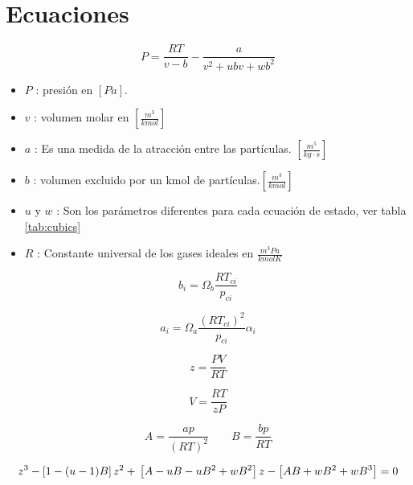 \chapter{Ecuaciones}



\begin{equation}\label{eq:pressure}
P = \frac{R T}{v-b} - \frac{a}{v^2 +u b v + w b^2 }
\end{equation}


\begin{itemize}\itemsep0ex
\item $P$ : presión en $[Pa]$.
\item $v$ : volumen molar en $[\frac{m^3}{kmol}]$
\item $a$ : Es una medida de la atracción entre las partículas. $[\frac{m^5}{kg \cdot s}]$
\item $b$ : volumen excluido por un kmol de partículas.$[\frac{m^3}{kmol}]$
\item $u$ y $w$ : Son los parámetros diferentes para cada ecuación de estado, ver tabla \ref{tab:cubics}
\item $R$ : Constante universal de los gases ideales en $\frac{m^3 Pa}{kmol K}$
\end{itemize}


\begin{equation}\label{eq:a}
	b_i = \Omega_b \frac{R T_{ci}}{p_{ci}} 
\end{equation}

\begin{equation}\label{eq:b}
 a_i = \Omega_a \frac{\left(R T_{ci}\right)^2}{p_{ci}} \alpha_i
\end{equation}


\begin{equation}\label{eq:z}
z= \frac{P V}{R T}
\end{equation}

\begin{equation}\label{eq:volume}
V = \frac{R T}{z P}
\end{equation}

\begin{equation}\label{eq:AB}
A=\frac{ap}{(RT)^2}
\qquad
B=\frac{bp}{RT}
\end{equation}

\begin{equation}
z^3-\left[1-(u-1)B\right]z^2+ \\ \left[A-uB-uB^2 +\\ wB^2\right]z-\left[AB+wB^2+wB^3\right]=0
\end{equation}


